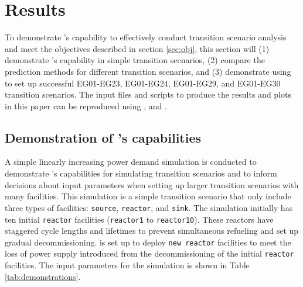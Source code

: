 \section{Results}
To demonstrate \deploy's capability to effectively conduct transition
scenario analysis and meet the objectives described in section 
\ref{sec:obj}, this section will 
(1) demonstrate \deploy's capability in simple transition scenarios, 
(2) compare the prediction methods for different transition scenarios, and
(3) demonstrate using \deploy to set up successful EG01-EG23, EG01-EG24, 
EG01-EG29, and EG01-EG30 transition scenarios. 
The input files and scripts to produce the results and plots in this
paper can be reproduced using \cite{dnoauthor_d3ploy:_2018}, and 
\cite{chee_arfc/transition-scenarios_2018}. 

\subsection{Demonstration of \deploy's capabilities}
\label{sec:demo}
A simple linearly increasing power demand simulation is conducted 
to demonstrate \deploy's capabilities for 
simulating transition scenarios and to inform decisions about 
input parameters when setting up larger transition scenarios 
with many facilities.
This simulation is a simple transition scenario that only include 
three types of facilities: \texttt{source}, \texttt{reactor}, and 
\texttt{sink}. 
The simulation initially has ten initial \texttt{reactor} facilities 
(\texttt{reactor1} to \texttt{reactor10}). 
These reactors have staggered cycle lengths and lifetimes to prevent 
simultaneous refueling and set up gradual decommissioning. 
\deploy is set up to deploy \texttt{new reactor} facilities
to meet the loss of power supply introduced from the decommissioning 
of the initial \texttt{reactor} facilities. 
The \deploy input parameters for the simulation is shown in Table 
\ref{tab:demonstrations}. 

